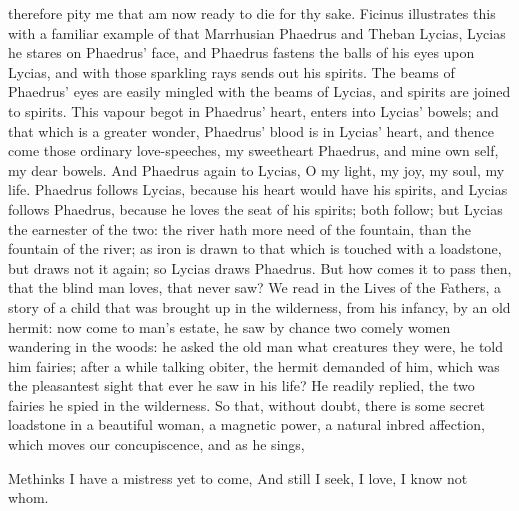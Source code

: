{therefore pity me that am now ready to die for thy sake. Ficinus
illustrates this with a familiar example of that Marrhusian Phaedrus
and Theban Lycias, Lycias he stares on Phaedrus' face, and
Phaedrus fastens the balls of his eyes upon Lycias, and with those
sparkling rays sends out his spirits. The beams of Phaedrus' eyes are
easily mingled with the beams of Lycias, and spirits are joined to
spirits. This vapour begot in Phaedrus' heart, enters into Lycias'
bowels; and that which is a greater wonder, Phaedrus' blood is in
Lycias' heart, and thence come those ordinary love-speeches, my
sweetheart Phaedrus, and mine own self, my dear bowels. And Phaedrus
again to Lycias, O my light, my joy, my soul, my life. Phaedrus follows
Lycias, because his heart would have his spirits, and Lycias follows
Phaedrus, because he loves the seat of his spirits; both follow; but
Lycias the earnester of the two: the river hath more need of the
fountain, than the fountain of the river; as iron is drawn to that
which is touched with a loadstone, but draws not it again; so Lycias
draws Phaedrus. But how comes it to pass then, that the blind man
loves, that never saw? We read in the Lives of the Fathers, a story of
a child that was brought up in the wilderness, from his infancy, by an
old hermit: now come to man's estate, he saw by chance two comely women
wandering in the woods: he asked the old man what creatures they were,
he told him fairies; after a while talking obiter, the hermit demanded
of him, which was the pleasantest sight that ever he saw in his life?
He readily replied, the two fairies he spied in the wilderness.
So that, without doubt, there is some secret loadstone in a beautiful
woman, a magnetic power, a natural inbred affection, which moves our
concupiscence, and as he sings,

Methinks I have a mistress yet to come,
And still I seek, I love, I know not whom.

}
